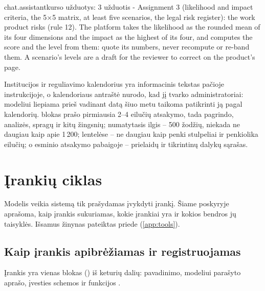 \begin{promptexcerpt}{chat.assistant}{kurso užduotys: 3 užduotis}
- Assignment 3 (likelihood and impact criteria, the 5×5 matrix, at least five scenarios, the legal risk register): the work product risks (rule 12). The platform takes the likelihood as the rounded mean of its four dimensions and the impact as the highest of its four, and computes the score and the level from them: quote its numbers, never recompute or re-band them. A scenario's levels are a draft for the reviewer to correct on the product's page.
\end{promptexcerpt}

Institucijos ir reguliavimo kalendorius yra informacinis tekstas pačioje instrukcijoje, o
kalendoriaus antraštė nurodo, kad jį tvarko administratoriai: modeliui liepiama prieš vadinant
datą šiuo metu taikoma patikrinti ją pagal kalendorių.  blokas prašo pirmiausia
2--4 eilučių atsakymo, tada pagrindo, analizės, spragų ir kitų žingsnių; numatytasis ilgis --
500 žodžių, niekada ne daugiau kaip apie 1\,200; lentelėse -- ne daugiau kaip penki stulpeliai ir
penkiolika eilučių; o esminio atsakymo pabaigoje -- prielaidų ir tikrintinų dalykų sąrašas.


\section{Įrankių ciklas}\label{sec:chat:tools}

Modelis veikia sistemą tik prašydamas įvykdyti įrankį. Šiame poskyryje aprašoma, kaip įrankis
sukuriamas, kokie įrankiai yra ir kokios bendros jų taisyklės. Išsamus žinynas pateiktas priede
(\cref{app:tools}).

\subsection{Kaip įrankis apibrėžiamas ir registruojamas}

Įrankis yra vienas  blokas () iš keturių dalių:
pavadinimo, modeliui parašyto aprašo, įvesties schemos ir funkcijos .


